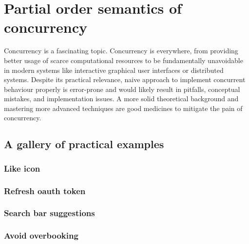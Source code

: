 \chapter{Partial order semantics of concurrency}
\label{sec:overview}
Concurrency is a fascinating topic.
Concurrency is everywhere, from providing better usage of scarce computational resources to be fundamentally unavoidable in modern systems like interactive graphical user interfaces or distributed systems.
Despite its practical relevance, naive approach to implement concurrent behaviour properly is error-prone and would likely result in pitfalls, conceptual mistakes, and implementation issues.
A more solid theoretical background and mastering more advanced techniques are good medicines to mitigate the pain of concurrency.



\section{A gallery of practical examples}
\subsection{Like icon}
\subsection{Refresh oauth token}
\subsection{Search bar suggestions}
\subsection{Avoid overbooking}
